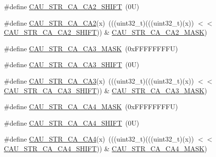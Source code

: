 \begin{DoxyCompactItemize}
\item 
\#define \mbox{\hyperlink{group___c_a_u___register___masks_gad603664f3d10bcbd341a2d244c0822f5}{C\+A\+U\+\_\+\+S\+T\+R\+\_\+\+C\+A\+\_\+\+C\+A2\+\_\+\+S\+H\+I\+FT}}~(0\+U)
\item 
\#define \mbox{\hyperlink{group___c_a_u___register___masks_ga29ee0e2f04ffcc28051a093305a77a16}{C\+A\+U\+\_\+\+S\+T\+R\+\_\+\+C\+A\+\_\+\+C\+A2}}(x)~(((uint32\+\_\+t)(((uint32\+\_\+t)(x)) $<$$<$ \mbox{\hyperlink{group___c_a_u___register___masks_gad603664f3d10bcbd341a2d244c0822f5}{C\+A\+U\+\_\+\+S\+T\+R\+\_\+\+C\+A\+\_\+\+C\+A2\+\_\+\+S\+H\+I\+FT}})) \& \mbox{\hyperlink{group___c_a_u___register___masks_ga7a41f2c437556c9a48ed99cd8607a9f9}{C\+A\+U\+\_\+\+S\+T\+R\+\_\+\+C\+A\+\_\+\+C\+A2\+\_\+\+M\+A\+SK}})
\item 
\#define \mbox{\hyperlink{group___c_a_u___register___masks_ga52281a79b1f2f28a74652e8934c3e8e7}{C\+A\+U\+\_\+\+S\+T\+R\+\_\+\+C\+A\+\_\+\+C\+A3\+\_\+\+M\+A\+SK}}~(0x\+F\+F\+F\+F\+F\+F\+F\+F\+U)
\item 
\#define \mbox{\hyperlink{group___c_a_u___register___masks_gac71abdf9ef9823b10c9d3e57bcc3e197}{C\+A\+U\+\_\+\+S\+T\+R\+\_\+\+C\+A\+\_\+\+C\+A3\+\_\+\+S\+H\+I\+FT}}~(0\+U)
\item 
\#define \mbox{\hyperlink{group___c_a_u___register___masks_gaf9892859cb2b2bbe38df4ca6530e2780}{C\+A\+U\+\_\+\+S\+T\+R\+\_\+\+C\+A\+\_\+\+C\+A3}}(x)~(((uint32\+\_\+t)(((uint32\+\_\+t)(x)) $<$$<$ \mbox{\hyperlink{group___c_a_u___register___masks_gac71abdf9ef9823b10c9d3e57bcc3e197}{C\+A\+U\+\_\+\+S\+T\+R\+\_\+\+C\+A\+\_\+\+C\+A3\+\_\+\+S\+H\+I\+FT}})) \& \mbox{\hyperlink{group___c_a_u___register___masks_ga52281a79b1f2f28a74652e8934c3e8e7}{C\+A\+U\+\_\+\+S\+T\+R\+\_\+\+C\+A\+\_\+\+C\+A3\+\_\+\+M\+A\+SK}})
\item 
\#define \mbox{\hyperlink{group___c_a_u___register___masks_ga201a5c7621a22e47519189370bcdb769}{C\+A\+U\+\_\+\+S\+T\+R\+\_\+\+C\+A\+\_\+\+C\+A4\+\_\+\+M\+A\+SK}}~(0x\+F\+F\+F\+F\+F\+F\+F\+F\+U)
\item 
\#define \mbox{\hyperlink{group___c_a_u___register___masks_gaf22d48103a45462f4f1c412212b28941}{C\+A\+U\+\_\+\+S\+T\+R\+\_\+\+C\+A\+\_\+\+C\+A4\+\_\+\+S\+H\+I\+FT}}~(0\+U)
\item 
\#define \mbox{\hyperlink{group___c_a_u___register___masks_gaaea02f5a37b0a49374d83562863cda67}{C\+A\+U\+\_\+\+S\+T\+R\+\_\+\+C\+A\+\_\+\+C\+A4}}(x)~(((uint32\+\_\+t)(((uint32\+\_\+t)(x)) $<$$<$ \mbox{\hyperlink{group___c_a_u___register___masks_gaf22d48103a45462f4f1c412212b28941}{C\+A\+U\+\_\+\+S\+T\+R\+\_\+\+C\+A\+\_\+\+C\+A4\+\_\+\+S\+H\+I\+FT}})) \& \mbox{\hyperlink{group___c_a_u___register___masks_ga201a5c7621a22e47519189370bcdb769}{C\+A\+U\+\_\+\+S\+T\+R\+\_\+\+C\+A\+\_\+\+C\+A4\+\_\+\+M\+A\+SK}})
$$
\end{DoxyCompactItemize}
